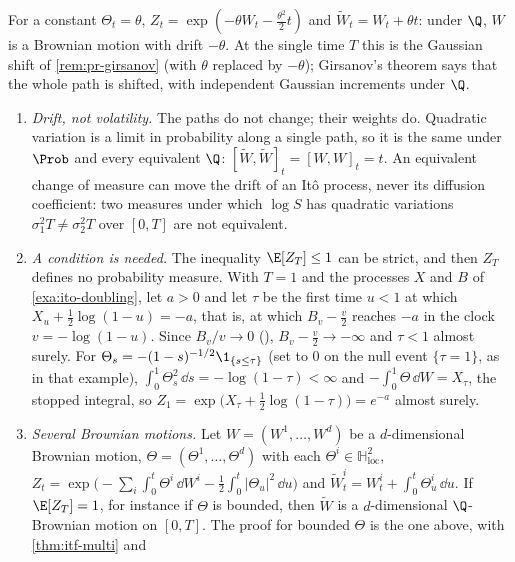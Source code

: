 For a constant $\Theta_t=\theta$, $Z_t=\exp(-\theta W_t-\frac{\theta^2}2t)$ and
$\widetilde W_t=W_t+\theta t$: under $\Q$, $W$ is a Brownian motion with drift $-\theta$. At
the single time $T$ this is the Gaussian shift of \cref{rem:pr-girsanov} (with $\theta$
replaced by $-\theta$); Girsanov's theorem says that the whole path is shifted, with
independent Gaussian increments under $\Q$.

\begin{remark}\label{rem:rn-girsanov-remarks}
\begin{enumerate}[label=(\alph*),leftmargin=*]
  \item \emph{Drift, not volatility.} The paths do not change; their weights do.
    Quadratic variation is a limit in probability along a single path, so it is the same
    under $\Prob$ and every equivalent $\Q$: $[\widetilde W,\widetilde W]_t=[W,W]_t=t$. An
    equivalent change of measure can move the drift of an It\^o process, never its
    diffusion coefficient: two measures under which $\log S$ has quadratic variations
    $\sigma_1^2T\ne\sigma_2^2T$ over $[0,T]$ are not equivalent.
  \item \emph{A condition is needed.} The inequality $\E[Z_T]\le1$ can be strict, and then
    $Z_T$ defines no probability measure. With $T=1$ and the processes $X$ and $B$ of
    \cref{exa:ito-doubling}, let $a>0$ and let $\tau$ be the first time $u<1$ at which
    $X_u+\frac12\log(1-u)=-a$, that is, at which $B_v-\frac v2$ reaches $-a$ in the clock
    $v=-\log(1-u)$. Since $B_v/v\to0$ (), $B_v-\frac v2\to-\infty$ and
    $\tau<1$ almost surely. For $\Theta_s=-(1-s)^{-1/2}\1_{\{s\le\tau\}}$ (set to $0$ on the
    null event $\{\tau=1\}$, as in that example), $\int_0^1\Theta_s^2\,\dd s=-\log(1-\tau)<\infty$
    and $-\int_0^1\Theta\,\dd W=X_\tau$, the stopped integral, so
    $Z_1=\exp\big(X_\tau+\frac12\log(1-\tau)\big)=e^{-a}$ almost surely.
  \item \emph{Several Brownian motions.} Let $W=(W^1,\dots,W^d)$ be a $d$-dimensional
    Brownian motion, $\Theta=(\Theta^1,\dots,\Theta^d)$ with each $\Theta^i\in\mathbb
    H^2_{\mathrm{loc}}$, $Z_t=\exp\big(-\sum_i\int_0^t\Theta^i\,\dd W^i-\frac12\int_0^t|\Theta_u|^2\,\dd u\big)$
    and $\widetilde W^i_t=W^i_t+\int_0^t\Theta^i_u\,\dd u$. If $\E[Z_T]=1$, for instance if
    $\Theta$ is bounded, then $\widetilde W$ is a $d$-dimensional $\Q$-Brownian motion on
    $[0,T]$. The proof for bounded $\Theta$ is the one above, with \cref{thm:itf-multi} and

\end{enumerate}
\end{remark}
